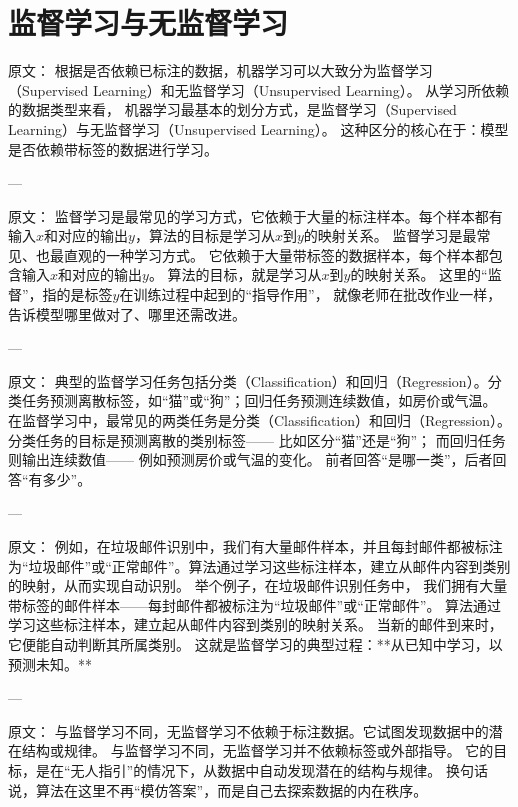 \section{监督学习与无监督学习}

原文：
根据是否依赖已标注的数据，机器学习可以大致分为监督学习（Supervised Learning）和无监督学习（Unsupervised Learning）。
从学习所依赖的数据类型来看，  
机器学习最基本的划分方式，是监督学习（Supervised Learning）与无监督学习（Unsupervised Learning）。  
这种区分的核心在于：模型是否依赖带标签的数据进行学习。

---

原文：
监督学习是最常见的学习方式，它依赖于大量的标注样本。每个样本都有输入$x$和对应的输出$y$，算法的目标是学习从$x$到$y$的映射关系。
监督学习是最常见、也最直观的一种学习方式。  
它依赖于大量带标签的数据样本，每个样本都包含输入$x$和对应的输出$y$。  
算法的目标，就是学习从$x$到$y$的映射关系。  
这里的“监督”，指的是标签$y$在训练过程中起到的“指导作用”，  
就像老师在批改作业一样，告诉模型哪里做对了、哪里还需改进。

---

原文：
典型的监督学习任务包括分类（Classification）和回归（Regression）。分类任务预测离散标签，如“猫”或“狗”；回归任务预测连续数值，如房价或气温。
在监督学习中，最常见的两类任务是分类（Classification）和回归（Regression）。  
分类任务的目标是预测离散的类别标签——  
比如区分“猫”还是“狗”；  
而回归任务则输出连续数值——  
例如预测房价或气温的变化。  
前者回答“是哪一类”，后者回答“有多少”。

---

原文：
例如，在垃圾邮件识别中，我们有大量邮件样本，并且每封邮件都被标注为“垃圾邮件”或“正常邮件”。算法通过学习这些标注样本，建立从邮件内容到类别的映射，从而实现自动识别。
举个例子，在垃圾邮件识别任务中，  
我们拥有大量带标签的邮件样本——每封邮件都被标注为“垃圾邮件”或“正常邮件”。  
算法通过学习这些标注样本，建立起从邮件内容到类别的映射关系。  
当新的邮件到来时，它便能自动判断其所属类别。  
这就是监督学习的典型过程：**从已知中学习，以预测未知。**

---

原文：
与监督学习不同，无监督学习不依赖于标注数据。它试图发现数据中的潜在结构或规律。
与监督学习不同，无监督学习并不依赖标签或外部指导。  
它的目标，是在“无人指引”的情况下，从数据中自动发现潜在的结构与规律。  
换句话说，算法在这里不再“模仿答案”，而是自己去探索数据的内在秩序。

